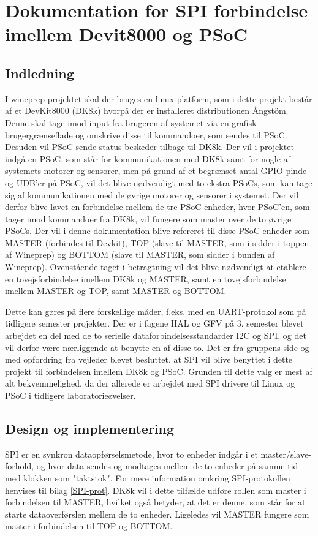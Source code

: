 \chapter{Dokumentation for SPI forbindelse imellem Devit8000 og PSoC}

\section{Indledning}
I wineprep projektet skal der bruges en linux platform, som i dette projekt består af et DevKit8000 (DK8k) hvorpå der er installeret distributionen Ångstöm. 
Denne skal tage imod input fra brugeren af systemet via en grafisk brugergrænseflade og omskrive disse til kommandoer, som sendes til PSoC. Desuden
vil PSoC sende status beskeder tilbage til DK8k.
Der vil i projektet indgå en PSoC, som står for kommunikationen med DK8k samt for nogle af systemets motorer og sensorer,
men på grund af et begrænset antal GPIO-pinde og UDB'er på PSoC, vil det blive nødvendigt med to ekstra PSoCs, som kan tage sig af kommunikationen med de 
øvrige motorer og sensorer i systemet. Der vil derfor blive lavet en forbindelse mellem de tre PSoC-enheder, hvor PSoC'en, som tager imod kommandoer fra
DK8k, vil fungere som master over de to øvrige PSoCs. Der vil i denne dokumentation blive refereret til disse PSoC-enheder som MASTER
(forbindes til Devkit), TOP (slave til MASTER, som i sidder i toppen af Wineprep) og BOTTOM (slave til MASTER, som sidder i bunden af
Wineprep).
Ovenstående taget i betragtning vil det blive nødvendigt at etablere en tovejsforbindelse imellem DK8k og MASTER, samt en tovejsforbindelse imellem 
MASTER og TOP, samt MASTER og BOTTOM. 

Dette kan gøres på flere forskellige måder, f.eks. med en UART-protokol som på tidligere semester projekter. Der er i fagene HAL og GFV på 3. semester 
blevet arbejdet en del med de to serielle dataforbindelsesstandarder I2C og SPI, og det vil derfor være nærliggende at benytte en af disse to. 
Det er fra gruppens side og med opfordring fra vejleder blevet besluttet, at SPI vil blive benyttet i dette projekt til forbindelsen imellem DK8k og 
PSoC. Grunden til dette valg er mest af alt bekvemmelighed, da der allerede er arbejdet med SPI drivere til Linux og PSoC i tidligere laboratorieøvelser.   

\section{Design og implementering}
SPI er en synkron dataopførselsmetode, hvor to enheder indgår i et master/slave-forhold, og hvor data sendes og modtages mellem de to enheder på
samme tid med klokken som "taktstok". For mere information omkring SPI-protokollen henvises til bilag \ref{SPI-prot}.
DK8k vil i dette tilfælde udføre rollen som master i forbindelsen til MASTER, hvilket også betyder, at det er denne, som står for at starte 
dataoverførslen mellem de to enheder. Ligeledes vil MASTER fungere som master i forbindelsen til TOP og BOTTOM.

